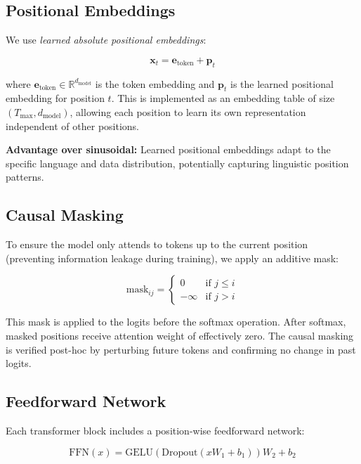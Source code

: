 \documentclass[11pt,a4paper]{article}
\begin{document}
\subsection{Positional Embeddings}

We use \textit{learned absolute positional embeddings}:

\begin{equation}
\mathbf{x}_t = \mathbf{e}_{\text{token}} + \mathbf{p}_t
\end{equation}

where $\mathbf{e}_{\text{token}} \in \mathbb{R}^{d_{\text{model}}}$ is the token embedding and $\mathbf{p}_t$ is the learned positional embedding for position $t$. This is implemented as an embedding table of size $(T_{\max}, d_{\text{model}})$, allowing each position to learn its own representation independent of other positions.

\textbf{Advantage over sinusoidal:} Learned positional embeddings adapt to the specific language and data distribution, potentially capturing linguistic position patterns.

\subsection{Causal Masking}

To ensure the model only attends to tokens up to the current position (preventing information leakage during training), we apply an additive mask:

\begin{equation}
\text{mask}_{ij} = \begin{cases}
0 & \text{if } j \le i \\
-\infty & \text{if } j > i
\end{cases}
\end{equation}

This mask is applied to the logits before the softmax operation. After softmax, masked positions receive attention weight of effectively zero. The causal masking is verified post-hoc by perturbing future tokens and confirming no change in past logits.

\subsection{Feedforward Network}

Each transformer block includes a position-wise feedforward network:

\begin{equation}
\text{FFN}(x) = \text{GELU}(\text{Dropout}(xW_1 + b_1))W_2 + b_2
\end{equation}
\end{document}
